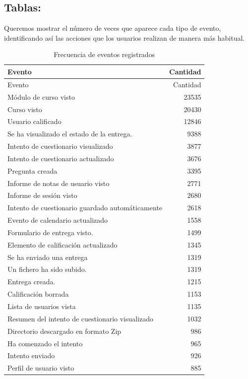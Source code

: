 \documentclass[notspecified,article,submit,moreauthors,pdftex]{Definitions/mdpi}
\begin{document}
\subsection{Tablas:}\label{tablas}

Queremos mostrar el número de veces que aparece cada tipo de evento,
identificando así las acciones que los usuarios realizan de manera más
habitual.

\begin{longtable}[]{@{}lr@{}}
\caption{Frecuencia de eventos registrados}\tabularnewline
\toprule\noalign{}
Evento & Cantidad \\
\midrule\noalign{}
\endfirsthead
\toprule\noalign{}
Evento & Cantidad \\
\midrule\noalign{}
\endhead
\bottomrule\noalign{}
\endlastfoot
Módulo de curso visto & 23535 \\
Curso visto & 20430 \\
Usuario calificado & 12846 \\
Se ha visualizado el estado de la entrega. & 9388 \\
Intento de cuestionario visualizado & 3877 \\
Intento de cuestionario actualizado & 3676 \\
Pregunta creada & 3395 \\
Informe de notas de usuario visto & 2771 \\
Informe de sesión visto & 2680 \\
Intento de cuestionario guardado automáticamente & 2618 \\
Evento de calendario actualizado & 1558 \\
Formulario de entrega visto. & 1499 \\
Elemento de calificación actualizado & 1345 \\
Se ha enviado una entrega & 1319 \\
Un fichero ha sido subido. & 1319 \\
Entrega creada. & 1215 \\
Calificación borrada & 1153 \\
Lista de usuarios vista & 1135 \\
Resumen del intento de cuestionario visualizado & 1032 \\
Directorio descargado en formato Zip & 986 \\
Ha comenzado el intento & 965 \\
Intento enviado & 926 \\
Perfil de usuario visto & 885 \\

\end{longtable}
\end{document}
